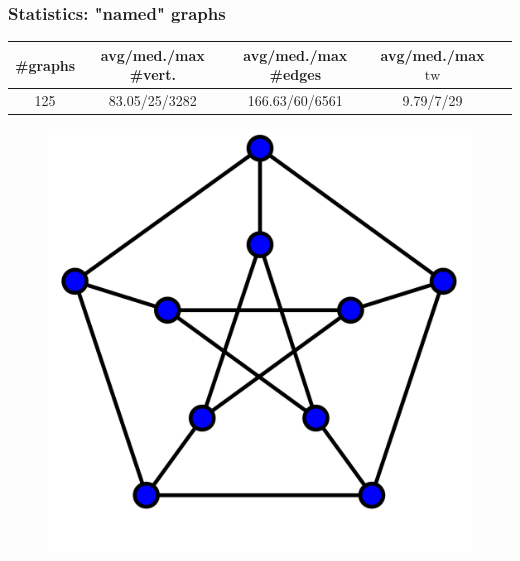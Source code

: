 \documentclass[11pt]{beamer}
\DeclareMathOperator{\tw}{tw}
\begin{document}
\begin{frame}
\frametitle{Statistics: "named" graphs}

\begin{center}
\footnotesize
\begin{table}[h!]
\centering
\begin{tabular}{|c|c|c|c|c|}
\hline
\#graphs & avg/med./max \#vert. & avg/med./max \#edges & avg/med./max $\tw$ \\
\hline \hline
125 & 83.05/25/3282 & 166.63/60/6561 & 9.79/7/29 \\
\hline
\end{tabular}
\end{table}
\end{center}

\begin{center}
\begin{figure}[h!]
\includegraphics[scale=0.06]{Petersen}
\hspace*{3mm}

\end{figure}
\end{center}
\end{frame}
\end{document}
